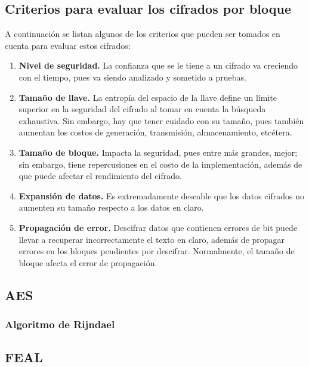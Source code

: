 \subsection{Criterios para evaluar los cifrados por bloque}

A continuación se listan algunos de los criterios que pueden ser tomados en cuenta para evaluar estos cifrados:
\begin{enumerate}
	\item \textbf{Nivel de seguridad.} La confianza que se le tiene a un 
		cifrado va creciendo con el tiempo, pues va siendo analizado y 
		sometido a pruebas.
	\item \textbf{Tamaño de llave.} La entropía del espacio de la llave 
		define un límite superior en la seguridad del cifrado al tomar en 
		cuenta la búsqueda exhaustiva. Sin embargo, hay que tener cuidado 
		con su tamaño, pues también aumentan los costos de generación, 
		transmisión, almacenamiento, etcétera.
	\item \textbf{Tamaño de bloque.} Impacta la seguridad, pues entre más 
		grandes, mejor; sin embargo, tiene repercusiones en el costo de la 
		implementación, además de que puede afectar el rendimiento del 
		cifrado.
	\item \textbf{Expansión de datos.} Es extremadamente deseable que los 
		datos cifrados no aumenten su tamaño respecto a los datos en claro.
	\item \textbf{Propagación de error.} Descifrar datos que contienen 
		errores de bit puede llevar a recuperar incorrectamente el texto en
		claro, además de propagar errores en los bloques pendientes por 
		descifrar. Normalmente, el tamaño de bloque afecta el error de 
		propagación.
\end{enumerate}

%

\subsection{AES}

\subsubsection{Algoritmo de Rijndael}

\subsection{FEAL}




